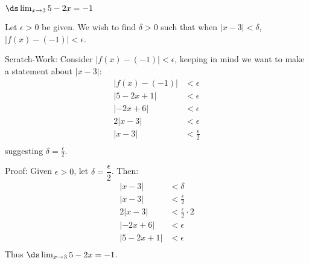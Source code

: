 {$\ds \lim_{x\to 3} 5-2x=-1$}
{Let $\epsilon >0$ be given. We wish to find $\delta >0$ such that when $|x-3|<\delta$, $|f(x)-(-1)|<\epsilon$. 

Scratch-Work:
Consider $|f(x)-(-1)|<\epsilon$, keeping in  mind we want to make a statement about $|x-3|$:
\begin{align*}
|f(x)-(-1)|&<\epsilon \\
|5-2x+1|&<\epsilon \\
|-2x+6|&<\epsilon\\
2|x-3|&<\epsilon \\
|x-3|&<\frac{\epsilon}{2}\\
\end{align*}
suggesting $\delta=\frac{\epsilon}{2}$.

Proof: Given $\epsilon>0$, let $\delta =\dfrac{\epsilon}2$. Then:
\begin{align*}
|x - 3| &< \delta \\
|x - 3| &< \frac{\epsilon}{2} \\
2|x - 3| &< \frac{\epsilon}{2}\cdot 2\\
|-2x+6|&< \epsilon \\
|5-2x+1|&< \epsilon  \\
\end{align*}
Thus  $\ds \lim_{x\to 3} 5-2x=-1$.}
